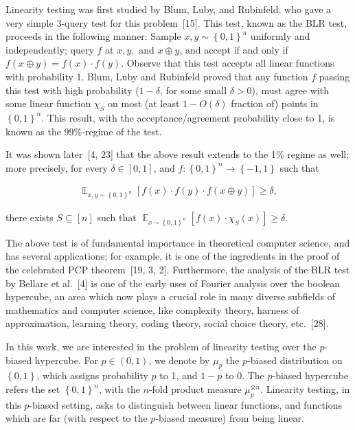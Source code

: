 \documentclass[10pt,a4paper]{article}
\begin{document}
Linearity testing was first studied by Blum, Luby, and Rubinfeld, who gave a very simple 3-query test for this problem [15].
This test, known as the BLR test, proceeds in the following manner: Sample $x,y\sim\left\{0,1\right\}^{n}$ uniformly and independently; query $f$ at $x,y,$ and $x\oplus y$, and accept if and only if $f(x\oplus y)=f(x)\cdot f(y)$.
Observe that this test accepts all linear functions with probability 1.
Blum, Luby and Rubinfeld proved that any function $f$ passing this test with high probability ($1-\delta$, for some small $\delta>0$), must agree with some linear function $\chi_{S}$ on most (at least $1-O(\delta)$ fraction of) points in $\left\{0,1\right\}^{n}$.
This result, with the acceptance/agreement probability close to 1, is known as the 99\%-regime of the test.\par




It was shown later [4, 23] that the above result extends to the 1\% regime as well; more precisely, for every $\delta\in[0,1]$, and $f:\left\{0,1\right\}^{n}\to\left\{-1,1\right\}$ such that\par


\[\begin{gathered}
\mathop{\mathbb{E}}_{x,y\sim\left\{0,1\right\}^{n}}\left[f(x)\cdot f(y)\cdot f(x\oplus y)\right]\geqslant\delta,
\end{gathered}\]


there exists $S\subseteq[n]$ such that $\mathop{\mathbb{E}}_{x\sim\left\{0,1\right\}^{n}}\left[f(x)\cdot\chi_{S}(x)\right]\geqslant\delta$.\par




The above test is of fundamental importance in theoretical computer science, and has several applications; for example, it is one of the ingredients in the proof of the celebrated PCP theorem [19, 3, 2].
Furthermore, the analysis of the BLR test by Bellare et al. [4] is one of the early uses of Fourier analysis over the boolean hypercube, an area which now plays a crucial role in many diverse subfields of mathematics and computer science, like complexity theory, harness of approximation, learning theory, coding theory, social choice theory, etc. [28].\par




In this work, we are interested in the problem of linearity testing over the $p$-biased hypercube.
For $p\in(0,1)$, we denote by $\mu_{p}$ the $p$-biased distribution on $\left\{0,1\right\}$, which assigns probability $p$ to 1, and $1-p$ to 0.
The $p$-biased hypercube refers the set $\left\{0,1\right\}^{n}$, with the $n$-fold product measure $\mu_{p}^{\otimes n}$.
Linearity testing, in this $p$-biased setting, asks to distinguish between linear functions, and functions which are far (with respect to the $p$-biased measure) from being linear.\par
\end{document}
